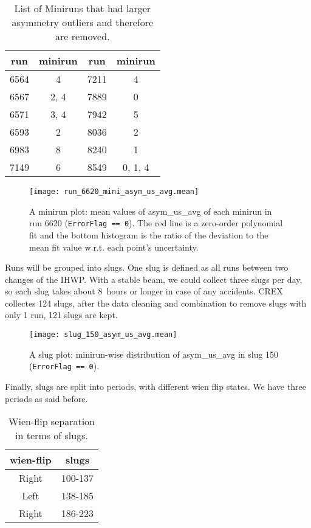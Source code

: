 \begin{table}[!h]
    \centering
    \begin{tabular}{c c | c c}
	\hline
	run & minirun	& run	& minirun   \\
	\hline
	6564	& 4	& 7211	& 4 \\
	6567	& 2, 4	& 7889	& 0 \\
	6571	& 3, 4	& 7942	& 5 \\
	6593	& 2	& 8036	& 2 \\
	6983	& 8	& 8240	& 1 \\
	7149	& 6	& 8549	& 0, 1, 4   \\
	\hline
    \end{tabular}
    \caption{List of Miniruns that had larger asymmetry outliers and therefore
    are removed.}
    \label{tab:bad_miniruns}
\end{table}
\begin{figure}[!h]
    \centering
    \texttt{[image: run\_6620\_mini\_asym\_us\_avg.mean]}
    \caption[A minirun plot]
    {A minirun plot: mean values of asym\_us\_avg of each minirun in 
    run 6620 (\texttt{ErrorFlag == 0}).
    The red line is a zero-order polynomial fit and the bottom histogram is
    the ratio of the deviation to the mean fit value w.r.t. each point's uncertainty.
    }
\end{figure}

Runs will be grouped into slugs. One slug is defined as all runs between two
changes of the IHWP. With a stable beam, we could collect three slugs per day, so 
each slug takes about 8~hours or longer in case of any accidents. CREX collectes
124 slugs, after the data cleaning and combination to remove slugs with only 1 run, 
121 slugs are kept.
\begin{figure}[!h]
    \centering
    \texttt{[image: slug\_150\_asym\_us\_avg.mean]}
    \caption[A slug plot]
    {A slug plot: minirun-wise distribution of asym\_us\_avg in slug 150 
    (\texttt{ErrorFlag == 0}).}
\end{figure}

Finally, slugs are split into periods, with different wien flip states. 
We have three periods as said before.
\begin{table}[!h]
    \centering
    \begin{tabular}{c | c}
	\hline
	wien-flip   & slugs \\
	\hline
	Right	& 100-137   \\
	Left	& 138-185   \\
	Right	& 186-223   \\
	\hline
    \end{tabular}
    \caption{Wien-flip separation in terms of slugs.}
\end{table}


